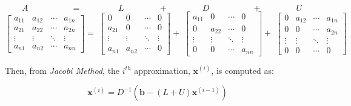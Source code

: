 \documentclass[main]{subfiles}
\begin{document}
    $\quad\quad A \quad\quad\quad\quad\quad = \quad\quad\quad\quad\; L \quad\quad\quad\quad +  \quad\quad\quad\quad D \quad\quad\quad\quad\quad + \quad\quad\quad\quad U$ 
    \begin{equation*}
        \begin{bmatrix}
            a_{11} & a_{12} & \cdots & a_{1n} \\
            a_{21} & a_{22} & \cdots & a_{2n} \\
            \vdots & \vdots & \ddots& \vdots \\
            a_{n1} & a_{n2} & \cdots & a_{nn}
        \end{bmatrix} =
        \;
        \begin{bmatrix}
            0      & 0      & \cdots & 0 \\
            a_{21} & 0      & \cdots & 0 \\
            \vdots & \vdots & \ddots& \vdots \\
            a_{n1} & a_{n2} & \cdots & 0
        \end{bmatrix}+
        \;
        \begin{bmatrix}
            a_{11} & 0      & \cdots & 0 \\
            0      & a_{22} & \cdots & 0 \\
            \vdots & \vdots & \ddots & \vdots \\
            0      & 0      & \cdots & a_{nn}
        \end{bmatrix}+
        \;
        \begin{bmatrix}
            0      & a_{12} & \cdots & a_{1n} \\
            0      & 0      & \cdots & a_{2n} \\
            \vdots & \vdots & \ddots & \vdots \\
            0      & 0      & \cdots & 0
        \end{bmatrix}
    \end{equation*}


    \vspace{14mm}

    Then, from \textit{Jacobi Method}, the $i^{th}$ approximation, $\textbf{x}^{(i)}$, is computed as:

    \begin{equation}
        \textbf{x}^{(i)} = D^{-1}(\textbf{b} - (L+U) \textbf{x}^{(i-1)})
    \end{equation}
\end{document}
